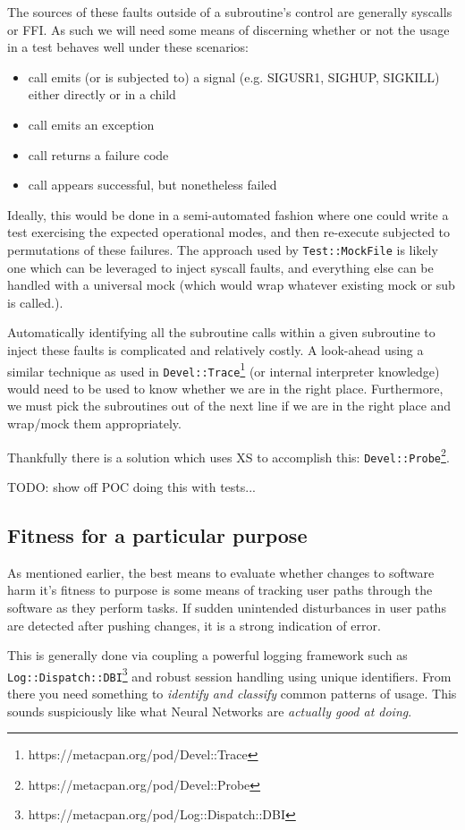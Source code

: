 \documentclass{article}
\begin{document}
The sources of these faults outside of a subroutine's control are generally syscalls or FFI.
As such we will need some means of discerning whether or not the usage in a test behaves well under these scenarios:
\begin{itemize}
\item call emits (or is subjected to) a signal (e.g. SIGUSR1, SIGHUP, SIGKILL) either directly or in a child
\item call emits an exception
\item call returns a failure code
\item call appears successful, but nonetheless failed
\end{itemize}
Ideally, this would be done in a semi-automated fashion where one could write a test exercising the expected operational modes, and then re-execute subjected to permutations of these failures.
The approach used by \texttt{Test::MockFile}\cite{mock} is likely one which can be leveraged to inject syscall faults, and everything else can be handled with a universal mock (which would wrap whatever existing mock or sub is called.).

Automatically identifying all the subroutine calls within a given subroutine to inject these faults is complicated and relatively costly.
A look-ahead using a similar technique as used in \texttt{Devel::Trace}\footnote{https://metacpan.org/pod/Devel::Trace} (or internal interpreter knowledge) would need to be used to know whether we are in the right place.
Furthermore, we must pick the subroutines out of the next line if we are in the right place and wrap/mock them appropriately.

Thankfully there is a solution which uses XS to accomplish this: \texttt{Devel::Probe}\footnote{https://metacpan.org/pod/Devel::Probe}.

TODO: show off POC doing this with tests...

\subsection{Fitness for a particular purpose}

As mentioned earlier, the best means to evaluate whether changes to software harm it's fitness to purpose is some means of tracking user paths through the software as they perform tasks.
If sudden unintended disturbances in user paths are detected after pushing changes, it is a strong indication of error.

This is generally done via coupling a powerful logging framework such as \texttt{Log::Dispatch::DBI}\footnote{https://metacpan.org/pod/Log::Dispatch::DBI} and robust session handling using unique identifiers.
From there you need something to \textit{identify and classify} common patterns of usage.
This sounds suspiciously like what Neural Networks are \textit{actually good at doing}.
\end{document}
